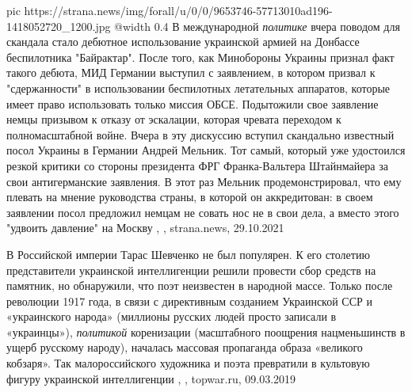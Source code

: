 \ifcmt
  pic https://strana.news/img/forall/u/0/0/9653746-57713010ad196-1418052720_1200.jpg
  @width 0.4
\fi
В международной \emph{политике} вчера поводом для скандала стало дебютное
использование украинской армией на Донбассе беспилотника "Байрактар". После
того, как Минобороны Украины признал факт такого дебюта, МИД Германии выступил
с заявлением, в котором призвал к "сдержанности" в использовании беспилотных
летательных аппаратов, которые имеет право использовать только миссия ОБСЕ.
Подытожили свое заявление немцы призывом к отказу от эскалации, которая чревата
переходом к полномасштабной войне.  Вчера в эту дискуссию вступил скандально
известный посол Украины в Германии Андрей Мельник. Тот самый, который уже
удостоился резкой критики со стороны президента ФРГ Франка-Вальтера Штайнмайера
за свои антигерманские заявления. В этот раз Мельник продемонстрировал, что ему
плевать на мнение руководства страны, в которой он аккредитован: в своем
заявлении посол предложил немцам не совать нос не в свои дела, а вместо этого
"удвоить давление" на Москву
, 
, strana.news, 29.10.2021

В Российской империи Тарас Шевченко не был популярен. К его столетию
представители украинской интеллигенции решили провести сбор средств на
памятник, но обнаружили, что поэт неизвестен в народной массе. Только после
революции 1917 года, в связи с директивным созданием Украинской ССР и
«украинского народа» (миллионы русских людей просто записали в «украинцы»),
\emph{политикой} коренизации (масштабного поощрения нацменьшинств в ущерб русскому
народу), началась массовая пропаганда образа «великого кобзаря». Так
малороссийского художника и поэта превратили в культовую фигуру украинской
интеллигенции
, , topwar.ru, 09.03.2019
